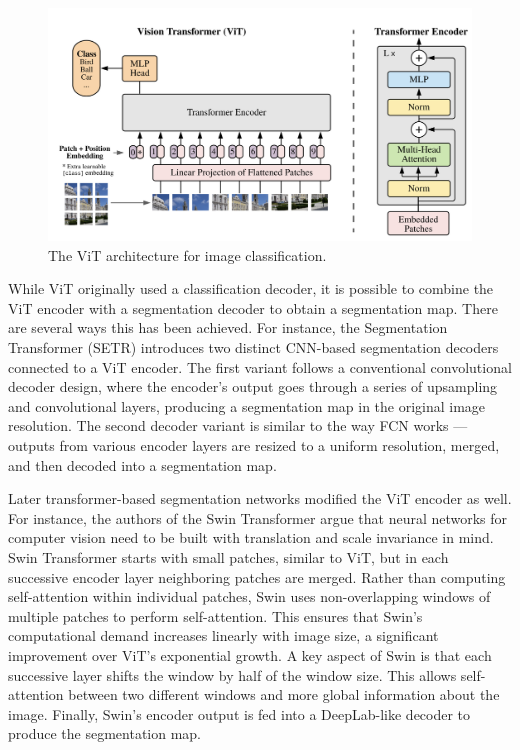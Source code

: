   \begin{figure}[h!]
 \centering
 \includegraphics[width=\linewidth]{images/vit-arch}
 \caption{The ViT architecture for image classification. \cite{dosovitskiy2021an}}
 \label{fig:vit-arch}
 \end{figure}
 
 While ViT originally used a classification decoder, it is possible to combine the ViT encoder with a segmentation decoder to obtain a segmentation map. There are several ways this has been achieved. For instance, the Segmentation Transformer (SETR) \cite{SETR} introduces two distinct CNN-based segmentation decoders connected to a ViT encoder. The first variant follows a conventional convolutional decoder design, where the encoder's output goes through a series of upsampling and convolutional layers, producing a segmentation map in the original image resolution. The second decoder variant is similar to the way FCN works --- outputs from various encoder layers are resized to a uniform resolution, merged, and then decoded into a segmentation map.

 Later transformer-based segmentation networks modified the ViT encoder as well. For instance, the authors of the Swin Transformer \cite{liu2021Swin} argue that neural networks for computer vision need to be built with translation and scale invariance in mind. Swin Transformer starts with small patches, similar to ViT, but in each successive encoder layer neighboring patches are merged. Rather than computing self-attention within individual patches, Swin uses non-overlapping windows of multiple patches to perform self-attention. This ensures that Swin’s computational demand increases linearly with image size, a significant improvement over ViT’s exponential growth. A key aspect of Swin is that each successive layer shifts the window by half of the window size. This allows self-attention between two different windows and more global information about the image. Finally, Swin's encoder output is fed into a DeepLab-like decoder to produce the segmentation map.
 
